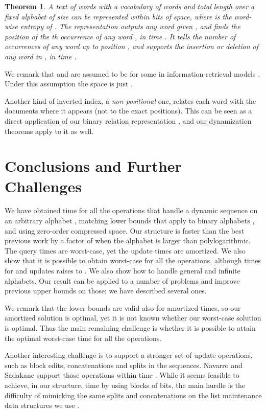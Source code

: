 \documentclass[11pt]{article}
\newtheorem{theorem}{Theorem}
\begin{document}
\begin{theorem}
A text of  words with a vocabulary of  words and total length 
over a fixed alphabet  of size  can be represented 
within 
bits of space, where  is
the word-wise entropy of .
The representation outputs any word 
given , and finds the position of the th occurrence of any word ,
in time .
It tells the number of occurrences of any word  up to position , and
supports the insertion or deletion of any word  in , in time 
.
\end{theorem}

We remark that  and  are assumed to be  for some 
 in information retrieval models \cite{BYRN11}. Under this
assumption the space is just .

Another kind of inverted index, a {\em non-positional} one, relates each word
with the documents where it appears (not to the exact positions). This can be
seen as a direct application of our binary relation representation
\cite{BCN10}, and our dynamization theorems apply to it as well.

\section{Conclusions and Further Challenges} \label{sec:concl}

We have obtained  time for all the operations that handle 
a dynamic sequence on an arbitrary alphabet , matching lower 
bounds that apply to binary alphabets \cite{FS89}, and using zero-order
compressed space. Our structure is faster than the best previous work 
\cite{HM10,NS10} by a factor of  when the
alphabet is larger than polylogarithmic. 
The query times are worst-case, yet the update times are amortized. We also
show that it is possible to obtain worst-case for all the operations, although
times for  and updates raises to .
We also show how to handle general and infinite alphabets.
Our result can be applied to a number of problems and improve previous
upper bounds on those; we have described several ones.

We remark that the lower bounds \cite{FS89} are valid also for amortized times,
so our amortized solution is optimal, yet it is not known whether our
worst-case solution is optimal. Thus the main remaining challenge is whether 
it is possible to attain the optimal  worst-case time 
for all the operations. 

Another interesting challenge is to support a stronger set of update 
operations, such as block edits, concatenations and splits in the sequences.
Navarro and Sadakane \cite{NS10} support those operations within time
. While it seems feasible to achieve, in our 
structure,  time by using blocks of  bits,
the main hurdle is the difficulty of mimicking the same splits and
concatenations on the list maintenance data structures we use 
\cite{IA84,Mor03}.




\end{document}
